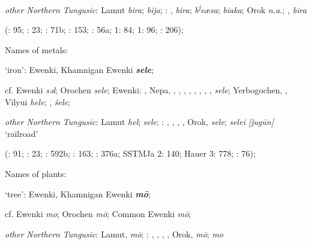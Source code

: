 \documentclass[output=paper,colorlinks,citecolor=brown]{langscibook}
\begin{document}
\begin{xlist}
\begin{xlist}
    \textit{other Northern Tungusic}: Lamut \textit{bira};  \textit{bija}; \textit{}: ,  \textit{bira};  \textit{b\textsuperscript{j}eæsa};  \textit{biaka}; Orok \textit{n.a.}; ,  \textit{bira}
    
    (\citealt{Castrén1856}: 95; \citealt{Janhunen1991}: 23; \citealt{Dorji1998}: 71b; \citealt{Chaoke2014a}: 153; \citealt{Vasilevic1958}: 56a; \citealt{Cincius1975B} 1: 84; \citealt{Hauer1952} 1: 96; \citealt{Zikmundová2013a}: 206);

\end{xlist}

    \ex Names of metals:

\begin{xlist}
    \ex ‘iron’:  Ewenki, Khamnigan Ewenki \textbf{\textit{sele}};

    cf.  Ewenki \textit{sǝl}; Orochen \textit{sele};  Ewenki: , Nepa, , , , , , , , ,  \textit{sele}; Yerbogochen, , Vilyui \textit{hele}; ,  \textit{šele};

    \textit{other Northern Tungusic}: Lamut \textit{hel};  \textit{sele}; \textit{}: , , , , Orok,  \textit{sele};  \textit{selei [ǰugūn]} ‘railroad’ 
    
    (\citealt{Castrén1856}: 91; \citealt{Janhunen1991}: 23; \citealt{Dorji1998}: 592b; \citealt{Chaoke2014a}: 163; \citealt{Vasilevic1958}: 376a; SSTMJa 2: 140; Hauer 3: 778; \citealt{Stary1990}: 76);

\end{xlist}

    \ex Names of plants:

\begin{xlist}
    \ex ‘tree’:  Ewenki, Khamnigan Ewenki \textbf{\textit{mō}};

    cf.  Ewenki \textit{mo}; Orochen \textit{mō};  Common Ewenki \textit{mō};

    \textit{other Northern Tungusic}: Lamut,  \textit{mō}; \textit{}: , , , , Orok,  \textit{mō};  \textit{mo}
    

\end{xlist}
\end{xlist}
\end{document}
